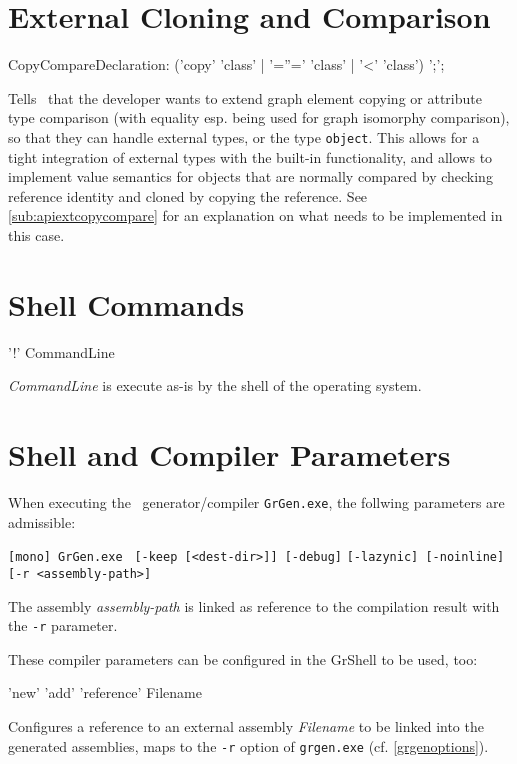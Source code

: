 \section{External Cloning and Comparison}\label{sub:extcopycompare}
\begin{rail}
  CopyCompareDeclaration: ('copy' 'class' | '=''=' 'class' | '<' 'class') ';';
\end{rail}
Tells \GrG~that the developer wants to extend graph element copying or attribute type comparison (with equality esp. being used for graph isomorphy comparison), so that they can handle external types, or the type \texttt{object}.
This allows for a tight integration of external types with the built-in functionality, 
and allows to implement value semantics for objects that are normally compared by checking reference identity and cloned by copying the reference.
See \ref{sub:apiextcopycompare} for an explanation on what needs to be implemented in this case.

\section{Shell Commands}

\begin{rail}
  '!' CommandLine
\end{rail}
\emph{CommandLine} is execute as-is by the shell of the operating system.

\section{Shell and Compiler Parameters}

\noindent When executing the \GrG\ generator/compiler \texttt{GrGen.exe}, the follwing parameters are admissible:

\noindent \texttt{[mono] GrGen.exe } \texttt{[-keep [<dest-dir>]] [-debug]} \texttt{[-lazynic] [-noinline]} \texttt{[-r <assembly-path>]}

The assembly \emph{assembly-path} is linked as reference to the compilation result with the \texttt{-r} parameter.

These compiler parameters can be configured in the GrShell to be used, too:
\begin{rail}
  'new' 'add' 'reference' Filename
\end{rail}
Configures a reference to an external assembly \emph{Filename} to be linked into the generated assemblies, maps to the \texttt{-r} option of \texttt{grgen.exe} (cf. \ref{grgenoptions}).

